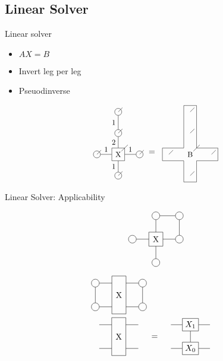 \subsection{Linear Solver}

\begin{frame}{Linear solver}
    \begin{minipage}{0.4\textwidth}
        \begin{itemize}
            \item $A X = B$
            \item Invert leg per leg
            \item Pseuodinverse
        \end{itemize}
    \end{minipage}
    \begin{minipage}{0.59\textwidth}
        \begin{equation}
            \scalebox{0.9}{ \pepoat } \;  =  \; \scalebox{0.9}{\blockat}
        \end{equation}
    \end{minipage}

\end{frame}

\begin{frame}{Linear Solver: Applicability}

    \begin{minipage}{.4\textwidth}
        \begin{equation}
            \vcenter{\hbox{ \crossloop } }
        \end{equation}
    \end{minipage}
    \begin{minipage}{.59\textwidth}

        \begin{subequations}
            \begin{align}
                 & \figb          \\
                 & \figc =  \figd
            \end{align}
        \end{subequations}
    \end{minipage}

\end{frame}

